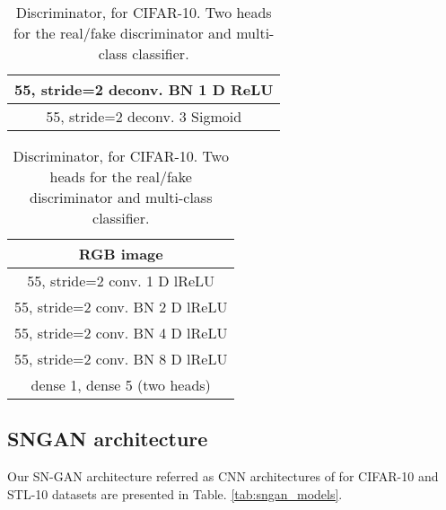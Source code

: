 \documentclass{article}
\begin{document}
\begin{table}[ht!]
\begin{subtable}{.32\linewidth}
{\begin{tabular}{c}
            \midrule
            55, stride=2 deconv. BN 1  D ReLU\\
            \midrule
            55, stride=2 deconv. 3 Sigmoid\\	
            \midrule
			\bottomrule
		\end{tabular}}
        \caption{\label{tab:gen_dcgan}Generator for CIFAR-10}
    \end{subtable}
    \begin{subtable}{.34\linewidth}
    	\centering
    	{\begin{tabular}{c}
			\toprule
			\midrule
			RGB image  \\
            \midrule
            55, stride=2 conv. 1  D lReLU\\
            \midrule
            55, stride=2 conv. BN 2  D lReLU\\        		 	
			\midrule
            55, stride=2 conv. BN 4  D lReLU\\            	
            \midrule
            55, stride=2 conv. BN 8  D lReLU\\    
            \midrule
            dense  1, dense  5 (two heads) \\
            \midrule
			\bottomrule
		\end{tabular}}
        \caption{\label{tab:dis_dcgan}Discriminator,  for CIFAR-10. Two heads for the real/fake discriminator and multi-class classifier.}
    \end{subtable}
\end{table}


\subsection{SNGAN architecture}

Our SN-GAN architecture referred as CNN architectures of \cite{miyato-iclr-2018} for CIFAR-10 and STL-10 datasets are presented in Table. \ref{tab:sngan_models}.
\end{document}
